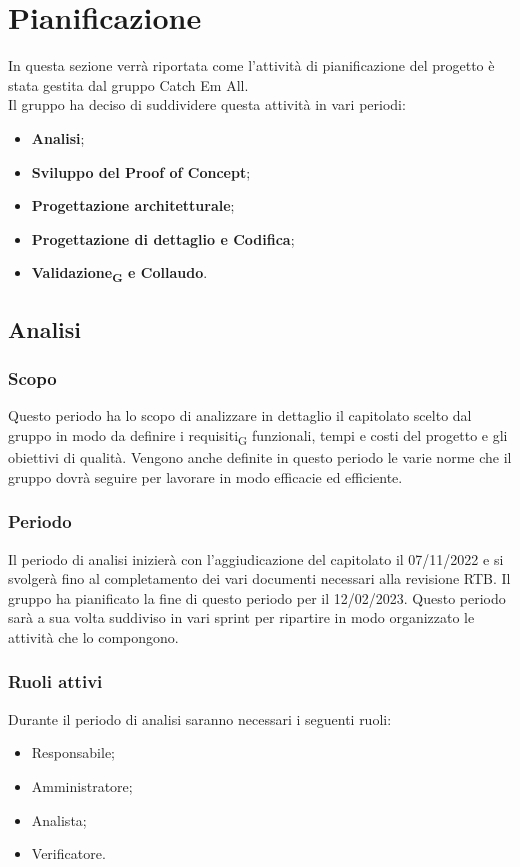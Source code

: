 \section{Pianificazione}
In questa sezione verrà riportata come l'attività di pianificazione del progetto è stata gestita dal gruppo Catch Em All. \\
Il gruppo ha deciso di suddividere questa attività in vari periodi:
\begin{itemize}
	\item \textbf{Analisi};
	\item \textbf{Sviluppo del Proof of Concept};
	\item \textbf{Progettazione architetturale};
    \item \textbf{Progettazione di dettaglio e Codifica};
	\item \textbf{Validazione\textsubscript{G} e Collaudo}.
\end{itemize}

\subsection{Analisi}
\subsubsection{Scopo}
Questo periodo ha lo scopo di analizzare in dettaglio il capitolato scelto dal gruppo in modo da definire i requisiti\textsubscript{G} funzionali, tempi e costi del progetto e gli obiettivi di qualità. Vengono anche definite in questo periodo le varie norme che il gruppo dovrà seguire per lavorare in modo efficacie ed efficiente.

\subsubsection{Periodo}
Il periodo di analisi inizierà con l'aggiudicazione del capitolato il 07/11/2022 e si svolgerà fino al completamento dei vari documenti necessari alla revisione  RTB. Il gruppo ha pianificato la fine di questo periodo per il 12/02/2023. Questo periodo sarà a sua volta suddiviso in vari sprint per ripartire in modo organizzato le attività che lo compongono.

\subsubsection{Ruoli attivi}
Durante il periodo di analisi saranno necessari i seguenti ruoli:
\begin{itemize}
	\item Responsabile;
	\item Amministratore;
	\item Analista;
	\item Verificatore.
\end{itemize}

